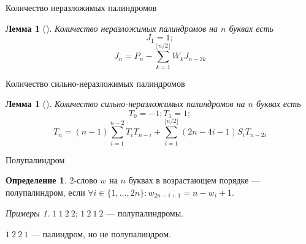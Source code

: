 \documentclass[14pt, aspectratio=169, notheorems]{beamer}
\theoremstyle{plain}
\newtheorem{lemma}[theorem]{Лемма}
\theoremstyle{definition}
\newtheorem{definition}[theorem]{Определение}
\theoremstyle{remark}
\newtheorem{examples}[theorem]{Примеры}
\begin{document}
\begin{frame}{Количество неразложимых палиндромов}
    \begin{lemma}[]
    Количество неразложимых палиндромов на $n$ буквах есть
    \begin{equation*}
        J_1 = 1;   
    \end{equation*}
    \begin{equation*}
        J_n = P_n - \sum_{k = 1}^{\lfloor n / 2 \rfloor}W_kJ_{n - 2k}
    \end{equation*}
    \end{lemma} 
\end{frame}


\begin{frame}{Количество сильно-неразложимых палиндромов}
    \begin{lemma}[]
    Количество сильно-неразложимых палиндромов на $n$ буквах есть 
    \begin{equation*}
        T_0 = -1; T_1 = 1; 
    \end{equation*}
    \begin{equation*}
    T_n = (n - 1) \sum_{i = 1}^{n - 2}T_i T_{n - i} + \sum_{i = 1}^{\lfloor n / 2 \rfloor} (2n - 4i - 1)S_i T_{n - 2i}
    \end{equation*}
    \end{lemma}
\end{frame}

\begin{frame}{Полупалиндром}
   \begin{definition}
    2-слово $w$ на $n$ буквах в возрастающем порядке --- полупалиндром, если $\forall i \in \{1, \dots, 2n\}:  w_{2n - i + 1} = n - w_i + 1$.
    \end{definition}
    \begin{examples}
    $1\ 1\ 2\ 2$; $1\ 2\ 1\ 2$ --- полупалиндромы.

    $1\ 2\ 2\ 1$ --- палиндром, но не полупалиндром.
    \end{examples}
    \begin{columns}
        \centering
        
        \centering
        
        \centering
        
    \end{columns}
\end{frame}
\end{document}
